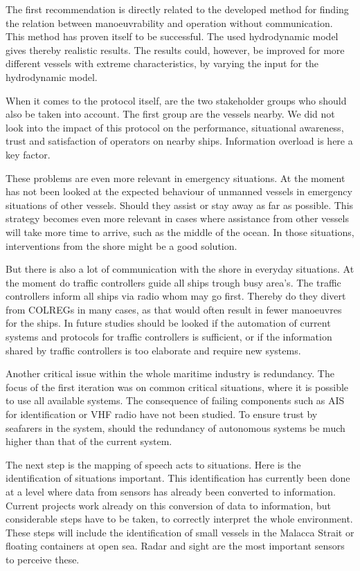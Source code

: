 The first recommendation is directly related to the developed method for finding the relation between manoeuvrability and operation without communication. This method has proven itself to be successful. The used hydrodynamic model gives thereby realistic results. The results could, however, be improved for more different vessels with extreme characteristics, by varying the input for the hydrodynamic model.

When it comes to the protocol itself, are the two stakeholder groups who should also be taken into account. The first group are the vessels nearby. We did not look into the impact of this protocol on the performance, situational awareness, trust and satisfaction of operators on nearby ships. Information overload is here a key factor. 

These problems are even more relevant in emergency situations. At the moment has not been looked at the expected behaviour of unmanned vessels in emergency situations of other vessels. Should they assist or stay away as far as possible. This strategy becomes even more relevant in cases where assistance from other vessels will take more time to arrive, such as the middle of the ocean. 
In those situations, interventions from the shore might be a good solution.

But there is also a lot of communication with the shore in everyday situations. At the moment do traffic controllers guide all ships trough busy area's. The traffic controllers inform all ships via radio whom may go first. Thereby do they divert from COLREGs in many cases, as that would often result in fewer manoeuvres for the ships. In future studies should be looked if the automation of current systems and protocols for traffic controllers is sufficient, or if the information shared by traffic controllers is too elaborate and require new systems. 

Another critical issue within the whole maritime industry is redundancy. The focus of the first iteration was on common critical situations, where it is possible to use all available systems. The consequence of failing components such as AIS for identification or \ac{VHF} radio have not been studied. To ensure trust by seafarers in the system, should the redundancy of autonomous systems be much higher than that of the current system.

The next step is the mapping of speech acts to situations. Here is the identification of situations important. This identification has currently been done at a level where data from sensors has already been converted to information. Current projects work already on this conversion of data to information, but considerable steps have to be taken, to correctly interpret the whole environment. These steps will include the identification of small vessels in the Malacca Strait or floating containers at open sea. Radar and sight are the most important sensors to perceive these. 

